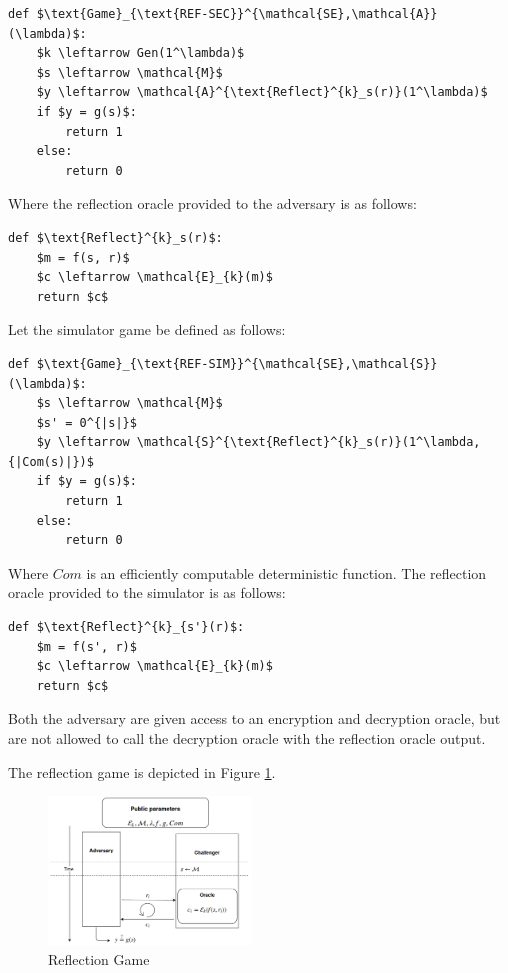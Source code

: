 \begin{lstlisting}[texcl,mathescape,basicstyle=\small]
def $\text{Game}_{\text{REF-SEC}}^{\mathcal{SE},\mathcal{A}}(\lambda)$:
    $k \leftarrow Gen(1^\lambda)$
    $s \leftarrow \mathcal{M}$
    $y \leftarrow \mathcal{A}^{\text{Reflect}^{k}_s(r)}(1^\lambda)$
    if $y = g(s)$:
        return 1
    else:
        return 0
\end{lstlisting}

Where the reflection oracle provided to the adversary is as follows:

\begin{lstlisting}[texcl,mathescape,basicstyle=\small]
def $\text{Reflect}^{k}_s(r)$:
    $m = f(s, r)$
    $c \leftarrow \mathcal{E}_{k}(m)$
    return $c$
\end{lstlisting}

Let the simulator game be defined as follows:

\begin{lstlisting}[texcl,mathescape,basicstyle=\small]
def $\text{Game}_{\text{REF-SIM}}^{\mathcal{SE},\mathcal{S}}(\lambda)$:
    $s \leftarrow \mathcal{M}$
    $s' = 0^{|s|}$
    $y \leftarrow \mathcal{S}^{\text{Reflect}^{k}_s(r)}(1^\lambda, {|Com(s)|})$
    if $y = g(s)$:
        return 1
    else:
        return 0
\end{lstlisting}

Where $Com$ is an efficiently computable deterministic function. The reflection
oracle provided to the simulator is as follows:

\begin{lstlisting}[texcl,mathescape,basicstyle=\small]
def $\text{Reflect}^{k}_{s'}(r)$:
    $m = f(s', r)$
    $c \leftarrow \mathcal{E}_{k}(m)$
    return $c$
\end{lstlisting}

Both the adversary are given access to an encryption and decryption oracle, but
are not allowed to call the decryption oracle with the reflection oracle output.

The reflection game is depicted in Figure \ref{fig:refgame}.

    \begin{figure}[thpb]
        \centering
            \includegraphics[width=0.48\textwidth]{figures/reflection_game.png}
        \caption{Reflection Game}
        \label{fig:refgame}
    \end{figure}

